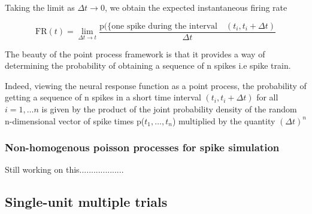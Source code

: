 Taking the limit as $\Delta t \rightarrow 0$, we obtain the expected instantaneous  firing rate
 
\begin{equation}\label{expected instant Firerate}
\displaystyle 
\text{FR}(t) =  \lim_{\Delta t \rightarrow t}  \dfrac{\text{p}(\{\text{one spike during the interval} \quad (t_{i}, t_{i}+\Delta t)}{\Delta t} 
\end{equation}


The beauty of the point process framework is that it provides a way of determining the probability of obtaining a sequence of n spikes i.e spike train.

Indeed, viewing the neural response function as a point process, the
probability of getting a sequence of n spikes in a short time interval
$(t_{i}, t_{i}+\Delta t)$ for all $i=1, \ldots n$ is given by the
product of the joint probability density of the random n-dimensional
vector of spike times p($t_{1}, \ldots, t_{n}$) multiplied by the quantity
$(\Delta t)^{n}$\\


\subsubsection{Non-homogenous poisson processes for spike simulation}
Still working on this...................


\subsection{Single-unit multiple trials}

